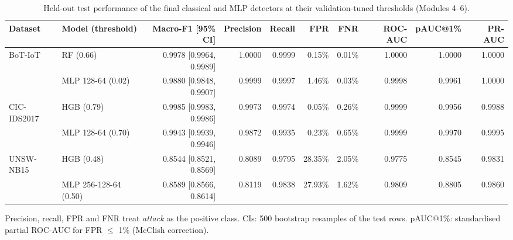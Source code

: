 \begin{table}[t]
\centering
\caption{Held-out test performance of the final classical and MLP detectors at their validation-tuned thresholds (Modules 4--6).}
\label{tab:test}
\footnotesize
\setlength{\tabcolsep}{3.5pt}
\begin{adjustbox}{max width=\linewidth}
\begin{tabular}{llrrrrrrrr}
\toprule
Dataset & Model (threshold) & Macro-F1 [95\% CI] & Precision & Recall & FPR & FNR & ROC-AUC & pAUC@1\% & PR-AUC \\
\midrule
BoT-IoT & RF (0.66) & 0.9978 [0.9964, 0.9989] & 1.0000 & 0.9999 & 0.15\% & 0.01\% & 1.0000 & 1.0000 & 1.0000 \\
 & MLP 128-64 (0.02) & 0.9880 [0.9848, 0.9907] & 0.9999 & 0.9997 & 1.46\% & 0.03\% & 0.9998 & 0.9961 & 1.0000 \\
\midrule
CIC-IDS2017 & HGB (0.79) & 0.9985 [0.9983, 0.9986] & 0.9973 & 0.9974 & 0.05\% & 0.26\% & 0.9999 & 0.9956 & 0.9988 \\
 & MLP 128-64 (0.70) & 0.9943 [0.9939, 0.9946] & 0.9872 & 0.9935 & 0.23\% & 0.65\% & 0.9999 & 0.9970 & 0.9995 \\
\midrule
UNSW-NB15 & HGB (0.48) & 0.8544 [0.8521, 0.8569] & 0.8089 & 0.9795 & 28.35\% & 2.05\% & 0.9775 & 0.8545 & 0.9831 \\
 & MLP 256-128-64 (0.50) & 0.8589 [0.8566, 0.8614] & 0.8119 & 0.9838 & 27.93\% & 1.62\% & 0.9809 & 0.8805 & 0.9860 \\
\bottomrule
\end{tabular}
\end{adjustbox}
\par\vspace{2pt}
\parbox{0.95\linewidth}{\scriptsize Precision, recall, FPR and FNR treat \emph{attack} as the positive class. CIs: 500 bootstrap resamples of the test rows. pAUC@1\%: standardised partial ROC-AUC for FPR $\le$ 1\% (McClish correction).}
\end{table}
